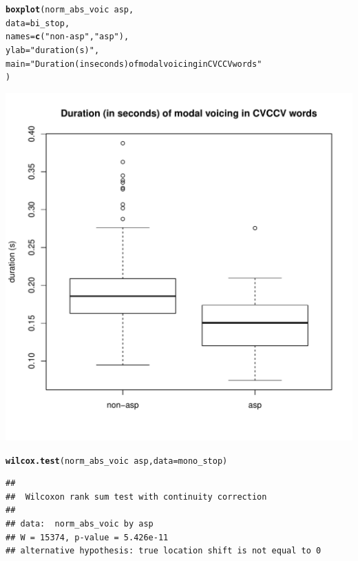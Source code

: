 \documentclass[a4paper,11pt]{article}\usepackage[]{graphicx}\usepackage[]{color}
\makeatletter
\def\maxwidth{ %
  \ifdim\Gin@nat@width>\linewidth
    \linewidth
  \else
    \Gin@nat@width
  \fi
}
\newcommand{\hlstr}[1]{\textcolor[rgb]{0.192,0.494,0.8}{#1}}%
\newcommand{\hlopt}[1]{\textcolor[rgb]{0,0,0}{#1}}%
\newcommand{\hlstd}[1]{\textcolor[rgb]{0.345,0.345,0.345}{#1}}%
\newcommand{\hlkwc}[1]{\textcolor[rgb]{0.333,0.667,0.333}{#1}}%
\newcommand{\hlkwd}[1]{\textcolor[rgb]{0.737,0.353,0.396}{\textbf{#1}}}%
\newenvironment{kframe}{%
 \def\at@end@of@kframe{}%
 \ifinner\ifhmode%
  \def\at@end@of@kframe{\end{minipage}}%
  \begin{minipage}{\columnwidth}%
 \fi\fi%
 \def\FrameCommand##1{\hskip\@totalleftmargin \hskip-\fboxsep
 \colorbox{shadecolor}{##1}\hskip-\fboxsep
     \hskip-\linewidth \hskip-\@totalleftmargin \hskip\columnwidth}%
 \MakeFramed {\advance\hsize-\width
   \@totalleftmargin\z@ \linewidth\hsize
   \@setminipage}}%
 {\par\unskip\endMakeFramed%
 \at@end@of@kframe}
\newenvironment{knitrout}{}{} %
\makeatother
\begin{document}
\begin{knitrout}
\color{fgcolor}\begin{kframe}
\begin{alltt}
\hlkwd{boxplot}\hlstd{(norm_abs_voic} \hlopt{~} \hlstd{asp,}
        \hlkwc{data} \hlstd{= bi_stop,}
        \hlkwc{names} \hlstd{=} \hlkwd{c}\hlstd{(}\hlstr{"non-asp"}\hlstd{,} \hlstr{"asp"}\hlstd{),}
        \hlkwc{ylab} \hlstd{=} \hlstr{"duration (s)"}\hlstd{,}
        \hlkwc{main} \hlstd{=} \hlstr{"Duration (in seconds) of modal voicing in CVCCV words"}
        \hlstd{)}
\end{alltt}
\end{kframe}

{\centering \includegraphics[width=\maxwidth]{img/bi-stop-box-1} 

}



\end{knitrout}

\begin{knitrout}
\color{fgcolor}\begin{kframe}
\begin{alltt}
\hlkwd{wilcox.test}\hlstd{(norm_abs_voic} \hlopt{~} \hlstd{asp,} \hlkwc{data} \hlstd{= mono_stop)}
\end{alltt}
\begin{verbatim}
## 
## 	Wilcoxon rank sum test with continuity correction
## 
## data:  norm_abs_voic by asp
## W = 15374, p-value = 5.426e-11
## alternative hypothesis: true location shift is not equal to 0
\end{verbatim}
\end{kframe}
\end{knitrout}
\end{document}
